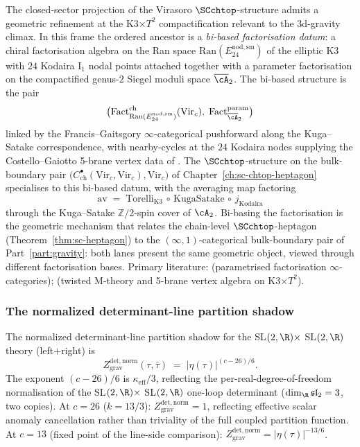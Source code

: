 \begin{remark}
\label{rem:3dqg-bi-based-factorisation}%
%
%
%
The closed-sector projection of the Virasoro $\SCchtop$-structure
admits a geometric refinement at the K3$\times T^2$ compactification
relevant to the 3d-gravity climax. In this frame the ordered
ancestor is a \emph{bi-based factorisation datum}: a chiral
factorisation algebra on the Ran space
$\mathrm{Ran}(E^{\mathrm{nod},\mathrm{sm}}_{24})$ of the elliptic
K3 with $24$ Kodaira I$_1$ nodal points attached together with a
parameter factorisation on the compactified genus-$2$ Siegel moduli
space $\overline{\cA}_2$. The bi-based structure is the pair
\[
\bigl(
\mathrm{Fact}^{\mathrm{ch}}_{\mathrm{Ran}(E^{\mathrm{nod},\mathrm{sm}}_{24})}(\mathrm{Vir}_c),
\;
\mathrm{Fact}^{\mathrm{param}}_{\overline{\cA}_2}
\bigr)
\]
linked by the Francis--Gaitsgory $\infty$-categorical pushforward
along the Kuga--Satake correspondence, with nearby-cycles at the
$24$ Kodaira nodes supplying the Costello--Gaiotto 5-brane vertex
data of \cite{CostelloGaiotto2018,Costello2021}. The
$\SCchtop$-structure on the bulk-boundary pair
$\bigl(C^\bullet_{\mathrm{ch}}(\mathrm{Vir}_c,\mathrm{Vir}_c),
\mathrm{Vir}_c\bigr)$ of
Chapter~\ref{ch:sc-chtop-heptagon} specialises to this bi-based
datum, with the averaging map factoring
\[
\mathrm{av}
\;=\;
\mathrm{Torelli}_{\mathrm{K3}}
\,\circ\,
\mathrm{KugaSatake}
\,\circ\,
j_{\mathrm{Kodaira}}
\]
through the Kuga--Satake $\mathbb{Z}/2$-spin cover of $\cA_2$.
Bi-basing the factorisation is the geometric mechanism that
relates the chain-level $\SCchtop$-heptagon
(Theorem~\ref{thm:sc-heptagon}) to the
$(\infty,1)$-categorical bulk-boundary pair of
Part~\ref{part:gravity}: both lanes present the same geometric
object, viewed through different factorisation bases.
Primary literature: \cite{FrancisGaitsgory2012} (parametrised
factorisation $\infty$-categories);
\cite{CostelloGaiotto2018,Costello2021} (twisted M-theory and
5-brane vertex algebra on K3$\times T^2$).
\end{remark}

\subsubsection*{The normalized determinant-line partition shadow}

The normalized determinant-line partition shadow for the SL$(2,\R) \times$
SL$(2,\R)$ theory (left$+$right) is
\[
Z_{\mathrm{grav}}^{\mathrm{det,norm}}(\tau, \bar\tau)
\;=\;
|\eta(\tau)|^{(c-26)/6}.
\]
The exponent $(c{-}26)/6$ is $\kappa_{\mathrm{eff}}/3$, reflecting
the per-real-degree-of-freedom normalisation of the
SL$(2,\R) \times$ SL$(2,\R)$ one-loop determinant
($\dim_{\R} \mathfrak{sl}_2 = 3$, two copies).
At $c = 26$ ($k = 13/3$):
$Z_{\mathrm{grav}}^{\mathrm{det,norm}} = 1$, reflecting effective scalar
anomaly cancellation rather than triviality of the full coupled
partition function. At $c = 13$ (fixed point of the line-side
comparison):
$Z_{\mathrm{grav}}^{\mathrm{det,norm}} = |\eta(\tau)|^{-13/6}$.

